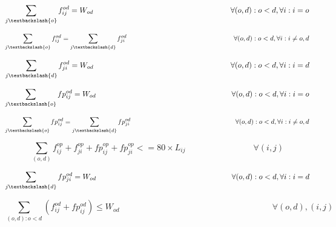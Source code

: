 \begin{equation}
\sum_{j\textbackslash \{o\}} f_{ij}^{od} = W_{od}  \qquad \qquad \qquad \qquad \qquad \qquad \qquad \qquad \qquad
\forall(o,d) : o < d, \forall i: i = o
\label{ILPTransp1}
\end{equation}

\begin{equation}
\sum_{j\textbackslash \{o\}} f_{ij}^{od} = \sum_{j\textbackslash \{d\}} f_{ji}^{od} \qquad \qquad \qquad \qquad \qquad \qquad \qquad \qquad
\forall(o,d) : o < d, \forall i: i \neq o,d
\label{ILPTransp2}
\end{equation}

\begin{equation}
\sum_{j\textbackslash \{d\}} f_{ji}^{od} = W_{od}  \qquad \qquad \qquad \qquad \qquad \qquad \qquad \qquad \qquad
\forall(o,d) : o < d, \forall i: i = d
\label{ILPTransp3}
\end{equation}

\begin{equation}
\sum_{j\textbackslash \{o\}} fp_{ij}^{od} = W_{od} \qquad \qquad \qquad \qquad \qquad \qquad \qquad \qquad \qquad
\forall(o,d) : o < d, \forall i: i = o
\label{ILPTransp1p}
\end{equation}

\begin{equation}
\sum_{j\textbackslash \{o\}} fp_{ij}^{od} = \sum_{j\textbackslash \{d\}} fp_{ji}^{od} \qquad \qquad \qquad \qquad \qquad \qquad \qquad \qquad
\forall(o,d) : o < d, \forall i: i \neq o,d
\label{ILPTransp2p}
\end{equation}

\begin{equation}
\sum_{(o,d)} f_{ij}^{op} + f_{ji}^{op} + fp_{ij}^{op} + fp_{ji}^{op}  <= 80 \times L_{ij} \qquad \qquad \qquad \qquad
\forall (i,j)
\label{ILPTranspL}
\end{equation}

\begin{equation}
\sum_{j\textbackslash \{d\}} fp_{ji}^{od} = W_{od} \qquad \qquad \qquad \qquad \qquad \qquad \qquad \qquad \qquad
\forall(o,d) : o < d, \forall i: i = d
\label{ILPTransp3p}
\end{equation}

\begin{equation}
\sum_{(o,d):o<d} \left(f_{ij}^{od}  + fp_{ij}^{od}\right) \leq W_{od}  \qquad \qquad \qquad \qquad \qquad \qquad \qquad \qquad \qquad
\forall (o,d), (i,j)
\label{ILPTransp4p}
\end{equation}

